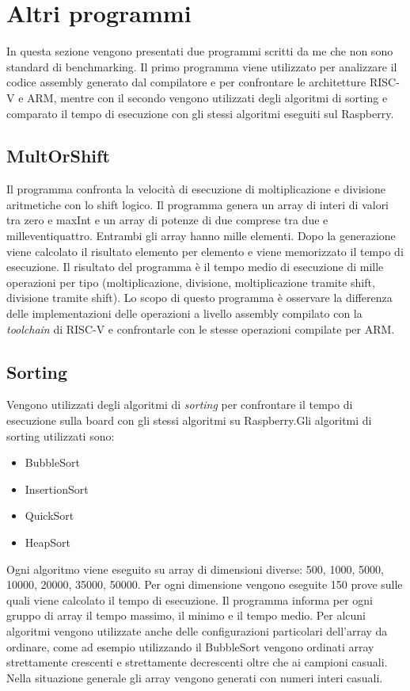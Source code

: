 \documentclass[12pt, a4paper]{report}
\begin{document}

\section{Altri programmi} 

In questa sezione vengono presentati due programmi scritti da me che non sono standard di benchmarking. Il primo programma viene utilizzato per analizzare il codice assembly generato dal compilatore e per confrontare le architetture RISC-V e ARM, mentre con il secondo vengono utilizzati degli algoritmi di sorting e comparato il tempo di esecuzione con gli stessi algoritmi eseguiti sul Raspberry.


\subsection{MultOrShift}
	Il programma confronta la velocità di esecuzione di moltiplicazione e divisione
aritmetiche con lo shift logico. Il programma genera un array di interi di
valori tra zero e maxInt e un array di potenze di due comprese tra due e
milleventiquattro. Entrambi gli array hanno mille elementi. Dopo la generazione
viene calcolato il risultato elemento per elemento e viene memorizzato il
tempo di esecuzione. Il risultato del programma \`e il tempo medio di esecuzione
di mille operazioni per tipo (moltiplicazione, divisione, 
moltiplicazione tramite shift, divisione tramite shift). 
Lo scopo di questo programma è osservare la differenza delle implementazioni delle operazioni a livello assembly compilato con la \textit{toolchain} di RISC-V e confrontarle con le stesse operazioni compilate per ARM.
		
		
\subsection{Sorting}
Vengono utilizzati degli algoritmi di \textit{sorting} per confrontare il tempo di esecuzione sulla board con gli stessi algoritmi su Raspberry.Gli algoritmi di sorting utilizzati sono:
\begin{itemize}
	\item BubbleSort
	\item InsertionSort
	\item QuickSort
	\item HeapSort
\end{itemize}

Ogni algoritmo viene eseguito su array di dimensioni diverse: 500, 1000, 5000, 10000, 20000, 35000, 50000. Per ogni dimensione vengono eseguite 150 prove sulle quali viene calcolato il tempo di esecuzione. Il programma informa per ogni gruppo di array il tempo massimo, il minimo e il tempo medio. Per alcuni algoritmi vengono utilizzate anche delle configurazioni particolari dell'array da ordinare, come ad esempio utilizzando il BubbleSort vengono ordinati array strettamente crescenti e strettamente decrescenti oltre che ai campioni casuali. Nella situazione generale gli array vengono generati con numeri interi casuali.
\end{document}
